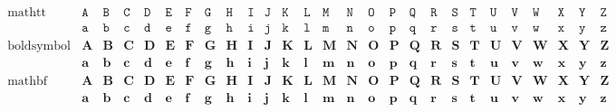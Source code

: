 \begin{align*}
\begin{array}{l|cccccccccccccccccccccccccc}
  \text{mathtt}\qquad &
  \mathtt{A} & \mathtt{B} & \mathtt{C} & \mathtt{D} & \mathtt{E} & \mathtt{F} & \mathtt{G} & \mathtt{H} & \mathtt{I} & \mathtt{J} & \mathtt{K} & \mathtt{L} & \mathtt{M} & \mathtt{N} & \mathtt{O} & \mathtt{P} & \mathtt{Q} & \mathtt{R} & \mathtt{S} & \mathtt{T} & \mathtt{U} & \mathtt{V} & \mathtt{W} & \mathtt{X} & \mathtt{Y} & \mathtt{Z} \\
  \text{} &
  \mathtt{a} & \mathtt{b} & \mathtt{c} & \mathtt{d} & \mathtt{e} & \mathtt{f} & \mathtt{g} & \mathtt{h} & \mathtt{i} & \mathtt{j} & \mathtt{k} & \mathtt{l} & \mathtt{m} & \mathtt{n} & \mathtt{o} & \mathtt{p} & \mathtt{q} & \mathtt{r} & \mathtt{s} & \mathtt{t} & \mathtt{u} & \mathtt{v} & \mathtt{w} & \mathtt{x} & \mathtt{y} & \mathtt{z} \\[2ex]
  \text{boldsymbol} &
  \boldsymbol{A} & \boldsymbol{B} & \boldsymbol{C} & \boldsymbol{D} & \boldsymbol{E} & \boldsymbol{F} & \boldsymbol{G} & \boldsymbol{H} & \boldsymbol{I} & \boldsymbol{J} & \boldsymbol{K} & \boldsymbol{L} & \boldsymbol{M} & \boldsymbol{N} & \boldsymbol{O} & \boldsymbol{P} & \boldsymbol{Q} & \boldsymbol{R} & \boldsymbol{S} & \boldsymbol{T} & \boldsymbol{U} & \boldsymbol{V} & \boldsymbol{W} & \boldsymbol{X} & \boldsymbol{Y} & \boldsymbol{Z} \\
  \text{} &
  \boldsymbol{a} & \boldsymbol{b} & \boldsymbol{c} & \boldsymbol{d} & \boldsymbol{e} & \boldsymbol{f} & \boldsymbol{g} & \boldsymbol{h} & \boldsymbol{i} & \boldsymbol{j} & \boldsymbol{k} & \boldsymbol{l} & \boldsymbol{m} & \boldsymbol{n} & \boldsymbol{o} & \boldsymbol{p} & \boldsymbol{q} & \boldsymbol{r} & \boldsymbol{s} & \boldsymbol{t} & \boldsymbol{u} & \boldsymbol{v} & \boldsymbol{w} & \boldsymbol{x} & \boldsymbol{y} & \boldsymbol{z} \\[2ex]
  \text{mathbf} &
  \mathbf{A} & \mathbf{B} & \mathbf{C} & \mathbf{D} & \mathbf{E} & \mathbf{F} & \mathbf{G} & \mathbf{H} & \mathbf{I} & \mathbf{J} & \mathbf{K} & \mathbf{L} & \mathbf{M} & \mathbf{N} & \mathbf{O} & \mathbf{P} & \mathbf{Q} & \mathbf{R} & \mathbf{S} & \mathbf{T} & \mathbf{U} & \mathbf{V} & \mathbf{W} & \mathbf{X} & \mathbf{Y} & \mathbf{Z} \\
  \text{} &
  \mathbf{a} & \mathbf{b} & \mathbf{c} & \mathbf{d} & \mathbf{e} & \mathbf{f} & \mathbf{g} & \mathbf{h} & \mathbf{i} & \mathbf{j} & \mathbf{k} & \mathbf{l} & \mathbf{m} & \mathbf{n} & \mathbf{o} & \mathbf{p} & \mathbf{q} & \mathbf{r} & \mathbf{s} & \mathbf{t} & \mathbf{u} & \mathbf{v} & \mathbf{w} & \mathbf{x} & \mathbf{y} & \mathbf{z} \\[2ex]

\end{array}
\end{align*}
